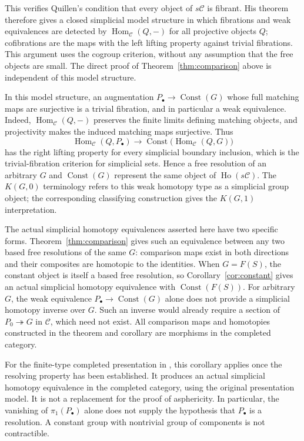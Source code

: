 \documentclass[11pt,a4paper]{article}
\theoremstyle{definition}
\newcommand{\C}{\mathcal C}
\newcommand{\Hom}{\operatorname{Hom}}
\newcommand{\Const}{\operatorname{Const}}
\begin{document}
This verifies Quillen's condition that every object of $s\C$ is
fibrant. His theorem therefore gives a closed simplicial model
structure in which fibrations and weak equivalences are detected by
$\Hom_{\C}(Q,-)$ for all projective objects $Q$; cofibrations are
the maps with the left lifting property against trivial fibrations.
This argument uses the cogroup criterion, without any assumption
that the free objects are small. The direct proof of
Theorem~\ref{thm:comparison} above is independent of this model
structure.

In this model structure, an augmentation $P_\bullet\to\Const(G)$
whose full matching maps are surjective is a trivial fibration, and
in particular a weak equivalence. Indeed, $\Hom_{\C}(Q,-)$ preserves
the finite limits defining matching objects, and projectivity makes
the induced matching maps surjective. Thus
\[
 \Hom_{\C}(Q,P_\bullet)\longrightarrow
 \Const\bigl(\Hom_{\C}(Q,G)\bigr)
\]
has the right lifting property for every simplicial boundary
inclusion, which is the trivial-fibration criterion for simplicial
sets. Hence a free resolution of an arbitrary $G$ and $\Const(G)$
represent the same object of $\operatorname{Ho}(s\C)$. The
$K(G,0)$ terminology refers to this weak homotopy type as a
simplicial group object; the corresponding classifying construction
gives the $K(G,1)$ interpretation.

The actual simplicial homotopy equivalences asserted here have two
specific forms. Theorem~\ref{thm:comparison} gives such an equivalence
between any two based free resolutions of the same $G$: comparison
maps exist in both directions and their composites are homotopic to
the identities. When $G=F(S)$, the constant object is itself a based
free resolution, so Corollary~\ref{cor:constant} gives an actual
simplicial homotopy equivalence with $\Const(F(S))$. For arbitrary
$G$, the weak equivalence $P_\bullet\to\Const(G)$ alone does not
provide a simplicial homotopy inverse over $G$. Such an inverse would
already require a section of $P_0\twoheadrightarrow G$ in $\C$,
which need not exist. All comparison maps and homotopies constructed
in the theorem and corollary are morphisms in the completed category.

For the finite-type completed presentation in \cite{Mikhovich}, this
corollary applies once the resolving property has been established.
It produces an actual simplicial homotopy equivalence in the completed
category, using the original presentation model. It is not a replacement
for the proof of asphericity. In particular, the vanishing of
$\pi_1(P_\bullet)$ alone does not supply the hypothesis that
$P_\bullet$ is a resolution. A constant group with nontrivial group of
components is not contractible.
\end{document}
